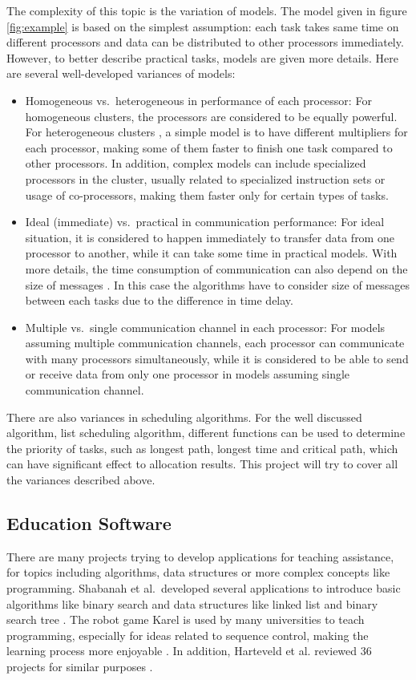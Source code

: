 \documentclass[a4paper,11pt]{article}
\begin{document}
The complexity of this topic is the variation of models. The model given in figure \ref{fig:example} is based on the simplest assumption: each task takes same time on different processors and data can be distributed to other processors immediately. However, to better describe practical tasks, models are given more details. Here are several well-developed variances of models:
\begin{itemize}
    \item Homogeneous vs.\ heterogeneous in performance of each processor: For homogeneous clusters, the processors are considered to be equally powerful. For heterogeneous clusters \cite{Topcuoglu}, a simple model is to have different multipliers for each processor, making some of them faster to finish one task compared to other processors. In addition, complex models can include specialized processors in the cluster, usually related to specialized instruction sets or usage of co-processors, making them faster only for certain types of tasks. 
    \item Ideal (immediate) vs.\ practical in communication performance: For ideal situation, it is considered to happen immediately to transfer data from one processor to another, while it can take some time in practical models. With more details, the time consumption of communication can also depend on the size of messages \cite{Robert2011}. In this case the algorithms have to consider size of messages between each tasks due to the difference in time delay.
    \item Multiple vs.\ single communication channel in each processor: For models assuming multiple communication channels, each processor can communicate with many processors simultaneously, while it is considered to be able to send or receive data from only one processor in models assuming single communication channel.
\end{itemize}
There are also variances in scheduling algorithms. For the well discussed algorithm, list scheduling algorithm, different functions can be used to determine the priority of tasks, such as longest path, longest time and critical path, which can have significant effect to allocation results. This project will try to cover all the variances described above.

\subsection{Education Software}

There are many projects trying to develop applications for teaching assistance, for topics including algorithms, data structures or more complex concepts like programming. Shabanah et al.\ developed several applications to introduce basic algorithms like binary search and data structures like linked list and binary search tree \cite{Shabanah2010}. The robot game Karel is used by many universities to teach programming, especially for ideas related to sequence control, making the learning process more enjoyable \cite{Becker2001}. In addition, Harteveld et al. reviewed 36 projects for similar purposes \cite{Harteveld}.
\end{document}

